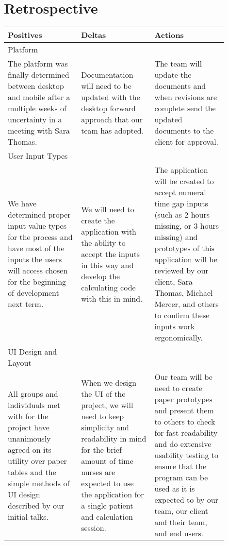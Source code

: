\documentclass[onecolumn, draftclsnofoot,10pt, compsoc]{IEEEtran}
\begin{document}
\section{Retrospective}
\begin{tabular}{p{0.3\linewidth} p{0.3\linewidth} p{0.3\linewidth}}
\large{Positives} & \large{Deltas} & \large{Actions}\\
\hline
Platform & \nobreakspace & \nobreakspace\\
\hline
The platform was finally determined between desktop and mobile after a multiple weeks of uncertainty in a meeting with Sara Thomas.&
Documentation will need to be updated with the desktop forward approach that our team has adopted.&
The team will update the documents and when revisions are complete send the updated documents to the client for approval.\\
\hline
User Input Types & \nobreakspace & \nobreakspace\\
\hline
We have determined proper input value types for the process and have most of the inputs the users will access chosen for the beginning of development next term.&
We will need to create the application with the ability to accept the inputs in this way and develop the calculating code with this in mind.&
The application will be created to accept numeral time gap inputs (such as 2 hours missing, or 3 hours missing) and prototypes of this application will be reviewed by our client, Sara Thomas, Michael Mercer, and others to confirm these inputs work ergonomically.\\
\hline
UI Design and Layout & \nobreakspace & \nobreakspace\\
\hline
All groups and individuals met with for the project have unanimously agreed on its utility over paper tables and the simple methods of UI design described by our initial talks.&
When we design the UI of the project, we will need to keep simplicity and readability in mind for the brief amount of time nurses are expected to use the application for a single patient and calculation session.&
Our team will be need to create paper prototypes and present them to others to check for fast readability and do extensive usability testing to ensure that the program can be used as it is expected to by our team, our client and their team, and end users.
\end{tabular}
\end{document}
